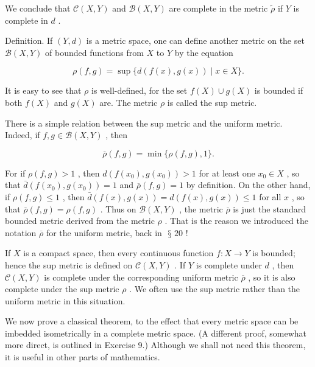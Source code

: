 \documentclass[10pt]{article}
\begin{document}
We conclude that \(\mathcal{C}\left( {X,Y}\right)\) and \(\mathcal{B}\left( {X,Y}\right)\) are complete in the metric \(\widetilde{\rho }\) if \(Y\) is complete in \(d\) .

Definition. If \(\left( {Y,d}\right)\) is a metric space, one can define another metric on the set \(\mathcal{B}\left( {X,Y}\right)\) of bounded functions from \(X\) to \(Y\) by the equation

\[
\rho \left( {f,g}\right)  = \sup \{ d\left( {f\left( x\right) ,g\left( x\right) }\right)  \mid  x \in  X\} .
\]

It is easy to see that \(\rho\) is well-defined, for the set \(f\left( X\right)  \cup  g\left( X\right)\) is bounded if both \(f\left( X\right)\) and \(g\left( X\right)\) are. The metric \(\rho\) is called the sup metric.

There is a simple relation between the sup metric and the uniform metric. Indeed, if \(f,g \in  \mathcal{B}\left( {X,Y}\right)\) , then

\[
\overline{\rho }\left( {f,g}\right)  = \min \{ \rho \left( {f,g}\right) ,1\} .
\]

For if \(\rho \left( {f,g}\right)  > 1\) , then \(d\left( {f\left( {x}_{0}\right) ,g\left( {x}_{0}\right) }\right)  > 1\) for at least one \({x}_{0} \in  X\) , so that \(\bar{d}\left( {f\left( {x}_{0}\right) ,g\left( {x}_{0}\right) }\right)  = 1\) and \(\overline{\rho }\left( {f,g}\right)  = 1\) by definition. On the other hand, if \(\rho \left( {f,g}\right)  \leq  1\) , then \(\bar{d}\left( {f\left( x\right) ,g\left( x\right) }\right)  = d\left( {f\left( x\right) ,g\left( x\right) }\right)  \leq  1\) for all \(x\) , so that \(\overline{\rho }\left( {f,g}\right)  = \rho \left( {f,g}\right)\) . Thus on \(\mathcal{B}\left( {X,Y}\right)\) , the metric \(\overline{\rho }\) is just the standard bounded metric derived from the metric \(\rho\) . That is the reason we introduced the notation \(\overline{\rho }\) for the uniform metric, back in \(\text{ § }{20}\) !

If \(X\) is a compact space, then every continuous function \(f : X \rightarrow  Y\) is bounded; hence the sup metric is defined on \(\mathcal{C}\left( {X,Y}\right)\) . If \(Y\) is complete under \(d\) , then \(\mathcal{C}\left( {X,Y}\right)\) is complete under the corresponding uniform metric \(\overline{\rho }\) , so it is also complete under the sup metric \(\rho\) . We often use the sup metric rather than the uniform metric in this situation.

We now prove a classical theorem, to the effect that every metric space can be imbedded isometrically in a complete metric space. (A different proof, somewhat more direct, is outlined in Exercise 9.) Although we shall not need this theorem, it is useful in other parts of mathematics.
\end{document}
